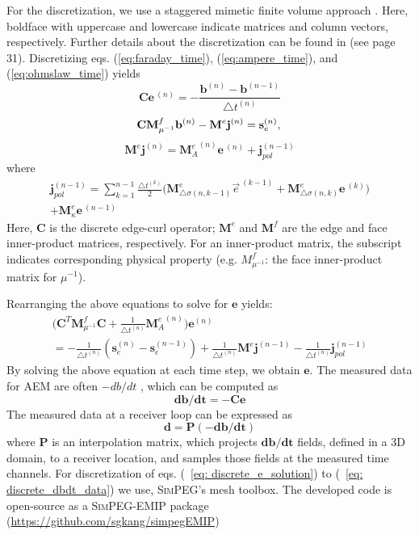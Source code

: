 \documentclass[manuscript]{geophysics}
\newcommand{\SimPEG}{\textsc{SimPEG}\xspace}
\newcommand{\dsig}{\triangle\sigma}
\newcommand{\dcurl}{{\mathbf C}}
\newcommand{\M}{{\mathbf M}}
\newcommand{\MfMui}{{\M^f_{\mu^{-1}}}}
\newcommand{\Me}{{\M^e}}
\newcommand{\Mes}[1]{{\M^e_{#1}}}
\newcommand {\e}  { {\vec e} }
\renewcommand {\dj}  { {\mathbf{j} } }
\newcommand {\db}  { {\mathbf{b} } }
\newcommand {\de}  { {\mathbf{e} } }
\begin{document}
For the discretization, we use a staggered mimetic finite volume approach \cite[]{hyman2002}. Here, boldface with uppercase and lowercase indicate matrices and column vectors, respectively. Further details about the discretization can be found in \cite{haber_book} (see page 31).
Discretizing eqs. (\ref{eq:faraday_time}), (\ref{eq:ampere_time}), and (\ref{eq:ohmslaw_time}) yields
\begin{equation}
  \dcurl \de^{\ (n)} = -\frac{\db^{(n)}-\db^{(n-1)}}{\triangle t^{(n)}}
    \label{eq:faraday_discrete}
\end{equation}
\begin{equation}
  \dcurl \MfMui \db^{(n)} - \Me \dj^{(n)} = \mathbf{s}_e^{(n)}, \\
  \label{eq:ampere_discrete}
\end{equation}
\begin{equation}
  \Me\dj^{(n)} = \Mes{A}^{(n)}\de^{\ (n)} + \dj_{pol}^{(n-1)}
  \label{eq:ohmslaw_discrete}
\end{equation}
where
\begin{align}
  \dj_{pol}^{(n-1)} = \sum_{k=1}^{n-1} \frac{\triangle t^{(k)}}{2} \Big(\Mes{\dsig (n, k-1)} \e^{\ (k-1)} + \Mes{\dsig (n, k)} \de^{\ (k)} \Big) \nonumber \\
  +  \Mes{\kappa} \de^{\ (n-1)}
\end{align}
Here, $\mathbf{C}$ is the discrete edge-curl operator; $\mathbf{M}^e$ and $\mathbf{M}^f$ are the edge and face inner-product matrices, respectively. For an inner-product matrix, the subscript indicates corresponding physical property (e.g. $M^{f}_{\mu^{-1}}$: the face inner-product matrix for $\mu^{-1}$).

Rearranging the above equations to solve for $\de$ yields:
\begin{align}
  \Big(\dcurl^T \MfMui \dcurl + \frac{1}{\triangle t^{(n)}} \Mes{A}^{(n)}\Big) \de^{(n)} \nonumber \\
  = - \frac{1}{\triangle t^{(n)}} (\mathbf{s}_e^{(n)}-\mathbf{s}_e^{(n-1)})
    + \frac{1}{\triangle t^{(n)}} \Me \dj^{(n-1)} - \frac{1}{\triangle t^{(n)}} \dj_{pol}^{(n-1)}
    \label{eq: discrete_e_solution}
\end{align}
By solving the above equation at each time step, we obtain $\de$. The measured data for AEM are often $-db/dt$ , which can be computed as
\begin{equation}
    \mathbf{db/dt} = -\dcurl \de
    \label{eq: discrete_dbdt_from_e}
\end{equation}
The measured data at a receiver loop can be expressed as
\begin{equation}
    \mathbf{d} = \mathbf{P} (-\mathbf{db/dt})
    \label{eq: discrete_dbdt_data}
\end{equation}
where $\mathbf{P}$ is an interpolation matrix, which projects $\mathbf{db/dt}$ fields, defined in a 3D domain, to a receiver location, and samples those fields at the measured time channels. For discretization of eqs. (~\ref{eq: discrete_e_solution}) to (~\ref{eq: discrete_dbdt_data}) we use, \SimPEG's mesh toolbox. The developed code is open-source as a \textsc{SimPEG-EMIP} package (\url{https://github.com/sgkang/simpegEMIP})
\end{document}
